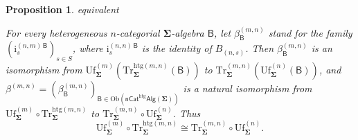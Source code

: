 \documentclass[a4paper, reqno]{amsbook}
\makeatletter
\newcommand{\sig}[1]{\mathbf{#1}}             %
\newcommand{\calg}[1]{\boldsymbol{\mathsf{#1}}} %
\newcommand{\htg}{\mathrm{htg}}                %
\newcommand{\Uf}{\mathrm{Uf}}
\newcommand{\Tr}{\mathrm{Tr}}
\theoremstyle{plain}
\newtheorem{proposition}[theorem]{Proposition}
\theoremstyle{definition}
\newcommand*{\CA@leanpending}{}
\newcommand*{\CA@leanrelation}{}
\newcommand*{\lean}[2]{%
  \ifcsname\string\color@lean@#1\endcsname\else
    \PackageError{main}{Unknown relation `#1' in \string\lean}{Use equivalent, weaker or stronger.}%
  \fi
  \gdef\CA@leanrelation{#1}%
  \gdef\CA@leanpending{#2}}
\makeatother
\begin{document}
\begin{proposition}\label{PCompatUfTr}\lean{equivalent}{Dimensions.truncationUnificationFunctor}
For every heterogeneous $n$-categorial $\sig{\Sigma}$-algebra $\calg{B}$, let $\beta^{(m,n)}_{\calg{B}}$ stand for the family $(\mathrm{i}^{(n,m)\,\calg{B}}_{s})_{s\in S}$, where $\mathrm{i}^{(n,n)\,\calg{B}}_{s}$ is the identity of $B_{(n,s)}$.
Then $\beta^{(m,n)}_{\calg{B}}$ is an isomorphism from $\Uf^{(m)}_{\sig{\Sigma}}(\Tr^{\htg(m,n)}_{\sig{\Sigma}}(\calg{B}))$ to $\Tr^{(m,n)}_{\sig{\Sigma}}(\Uf^{(n)}_{\sig{\Sigma}}(\calg{B}))$, and $\beta^{(m,n)}=(\beta^{(m,n)}_{\calg{B}})_{\calg{B}\in\mathrm{Ob}(\mathsf{nCat}^{\htg}\mathsf{Alg}(\sig{\Sigma}))}$ is a natural isomorphism from $\Uf^{(m)}_{\sig{\Sigma}}\circ \Tr^{\htg(m,n)}_{\sig{\Sigma}}$ to $\Tr^{(m,n)}_{\sig{\Sigma}}\circ\Uf^{(n)}_{\sig{\Sigma}}$.
Thus
$$
\Uf^{(m)}_{\sig{\Sigma}}\circ \Tr^{\htg(m,n)}_{\sig{\Sigma}}\cong \Tr^{(m,n)}_{\sig{\Sigma}}\circ\Uf^{(n)}_{\sig{\Sigma}}.
$$
\end{proposition}
\end{document}
